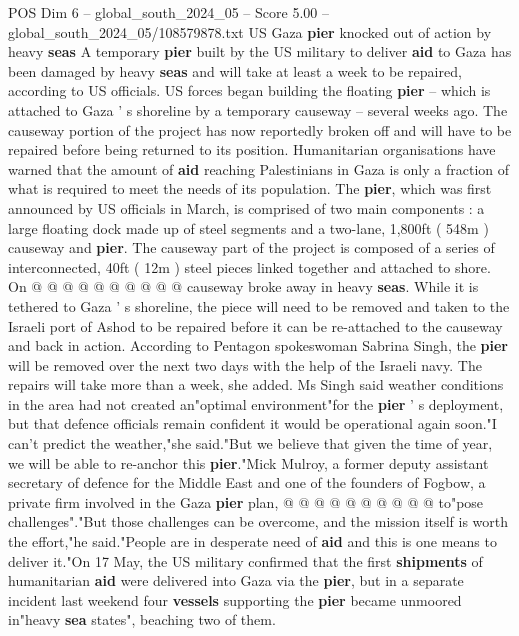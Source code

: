 \begin{textsample}{POS Dim 6 – global\_south\_2024\_05 – Score 5.00 – global\_south\_2024\_05/108579878.txt}  \label{ex:f6_pos_158}
US Gaza \textbf{pier} knocked out of action by heavy \textbf{seas} A temporary \textbf{pier} built by the US military to deliver \textbf{aid} to Gaza has been damaged by heavy \textbf{seas} and will take at least a week to be repaired, according to US officials.
US forces began building the floating \textbf{pier} -- which is attached to Gaza ' s shoreline by a temporary causeway -- several weeks ago.
The causeway portion of the project has now reportedly broken off and will have to be repaired before being returned to its position.
Humanitarian organisations have warned that the amount of \textbf{aid} reaching Palestinians in Gaza is only a fraction of what is required to meet the needs of its population.
The \textbf{pier}, which was first announced by US officials in March, is comprised of two main components : a large floating dock made up of steel segments and a two-lane, 1,800ft ( 548m ) causeway and \textbf{pier}.
The causeway part of the project is composed of a series of interconnected, 40ft ( 12m ) steel pieces linked together and attached to shore.
On @ @ @ @ @ @ @ @ @ @ causeway broke away in heavy \textbf{seas}.
While it is tethered to Gaza ' s shoreline, the piece will need to be removed and taken to the Israeli port of Ashod to be repaired before it can be re-attached to the causeway and back in action.
According to Pentagon spokeswoman Sabrina Singh, the \textbf{pier} will be removed over the next two days with the help of the Israeli navy.
The repairs will take more than a week, she added.
Ms Singh said weather conditions in the area had not created an"optimal environment"for the \textbf{pier} ' s deployment, but that defence officials remain confident it would be operational again soon."I can't predict the weather,"she said."But we believe that given the time of year, we will be able to re-anchor this \textbf{pier}."Mick Mulroy, a former deputy assistant secretary of defence for the Middle East and one of the founders of Fogbow, a private firm involved in the Gaza \textbf{pier} plan, @ @ @ @ @ @ @ @ @ @ to"pose challenges"."But those challenges can be overcome, and the mission itself is worth the effort,"he said."People are in desperate need of \textbf{aid} and this is one means to deliver it."On 17 May, the US military confirmed that the first \textbf{shipments} of humanitarian \textbf{aid} were delivered into Gaza via the \textbf{pier}, but in a separate incident last weekend four \textbf{vessels} supporting the \textbf{pier} became unmoored in"heavy \textbf{sea} states", beaching two of them.

\end{textsample}

